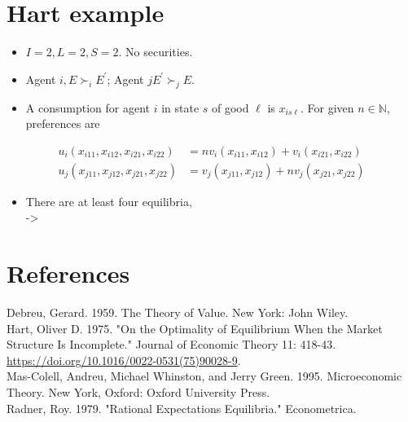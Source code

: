 \documentclass[10pt]{article}
\begin{document}
\section*{Hart example}
\begin{itemize}
  \item $I=2, L=2, S=2$. No securities.
  \item Agent $i, E \succ_{i} E^{\prime}$; Agent $j E^{\prime} \succ_{j} E$.
  \item A consumption for agent $i$ in state $s$ of good $\ell$ is $x_{i s \ell}$. For given $n \in \mathbb{N}$, preferences are
\end{itemize}

$$
\begin{aligned}
u_{i}\left(x_{i 11}, x_{i 12}, x_{i 21}, x_{i 22}\right) & =n v_{i}\left(x_{i 11}, x_{i 12}\right)+v_{i}\left(x_{i 21}, x_{i 22}\right) \\
u_{j}\left(x_{j 11}, x_{j 12}, x_{j 21}, x_{j 22}\right) & =v_{j}\left(x_{j 11}, x_{j 12}\right)+n v_{j}\left(x_{j 21}, x_{j 22}\right)
\end{aligned}
$$

\begin{itemize}
  \item There are at least four equilibria,\\
->
\end{itemize}

\section*{References}
Debreu, Gerard. 1959. The Theory of Value. New York: John Wiley.\\
Hart, Oliver D. 1975. "On the Optimality of Equilibrium When the Market Structure Is Incomplete." Journal of Economic Theory 11: 418-43. \href{https://doi.org/10.1016/0022-0531(75)90028-9}{https://doi.org/10.1016/0022-0531(75)90028-9}.\\
Mas-Colell, Andreu, Michael Whinston, and Jerry Green. 1995. Microeconomic Theory. New York, Oxford: Oxford University Press.\\
Radner, Roy. 1979. "Rational Expectations Equilibria." Econometrica.
\end{document}
